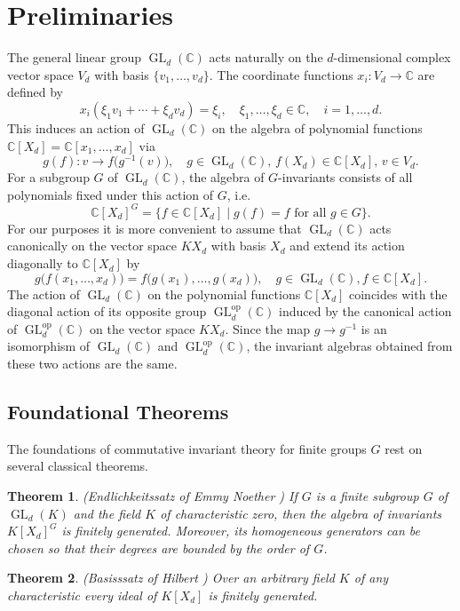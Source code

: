\documentclass{amsart}
\newtheorem{theorem}{Theorem}[section]
\theoremstyle{definition}
\DeclareMathOperator{\GL}{GL}
\newcommand{\C}{{\mathbb{C}}}
\newcommand{\op}{\mathrm{op}}
\begin{document}
\section{\textbf{Preliminaries}}
The general linear group $\GL_d(\C)$ acts naturally on the $d$-dimensional complex vector space $V_d$ with basis $\{v_1,\ldots,v_d\}$.
The coordinate functions $x_i:V_d\to {\mathbb C}$ are defined by
\[
x_i(\xi_1v_1+\cdots+\xi_dv_d)=\xi_i,\quad \xi_1,\ldots,\xi_d\in \C, \quad i=1,\ldots,d.
\]
This induces an action of $\GL_d(\C)$ on the algebra of polynomial functions $\C[X_d]={\mathbb C}[x_1,\ldots,x_d]$ via
\[
g(f):v\to f\big(g^{-1}(v)\big),\quad g\in \GL_d(\C),\, f(X_d)\in \C[X_d],\, v\in V_d.
\]
For a subgroup $G$ of $\GL_d(\C)$, the algebra of $G$-invariants consists of all polynomials fixed under this action of $G$, i.e.
\[
\C[X_d]^G=\big\{f\in \C[X_d]\mid g(f)=f\text{ for all }g\in G\big\}.
\]
For our purposes it is more convenient to assume that $\GL_d(\C)$ acts canonically on the vector space $KX_d$ with basis $X_d$ and extend its action diagonally to $\C[X_d]$ by
\[
g\big(f(x_1,\ldots,x_d)\big)=f\big(g(x_1),\ldots,g(x_d)\big),\quad g\in \GL_d(\C), f\in \C[X_d].
\]
The action of $\GL_d(\C)$ on the polynomial functions $\C[X_d]$ coincides
with the diagonal action of its opposite group $\GL_d^\op(\C)$ induced by the canonical action of $\GL_d^\op(\C)$ on the vector space $KX_d$.
Since the map  $g\to g^{-1}$ is an isomorphism of $\GL_d(\C)$ and $\GL_d^\op(\C)$, the invariant algebras obtained from these two actions are the same.

\subsection{Foundational Theorems}
The foundations of commutative invariant theory for finite groups $G$ rest on several classical theorems.

\begin{theorem}\label{Endlichkeitssatz} {\rm (Endlichkeitssatz of Emmy Noether \cite{No1})}
If $G$ is a finite subgroup $G$ of $\GL_d(K)$ and the field $K$ of characteristic zero, then the algebra of invariants $K[X_d]^G$ is finitely generated.
Moreover, its homogeneous generators can be chosen so that their degrees are bounded by the order of $G$.
\end{theorem}

\begin{theorem}\label{Basissatz} {\rm (Basisssatz of Hilbert \cite{Hi1})}
Over an arbitrary field $K$ of any characteristic every ideal of $K[X_d]$ is finitely generated.
\end{theorem}
\end{document}
